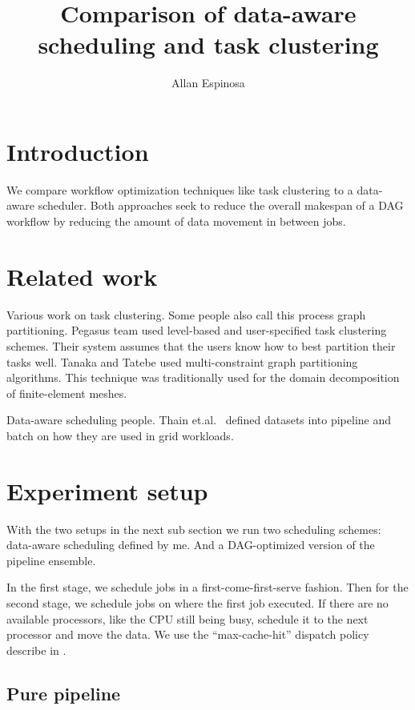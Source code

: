 \documentclass{article}
\title{Comparison of data-aware scheduling and task clustering}
\author{Allan Espinosa}
\begin{document}
\section{Introduction} %
\label{sec:introduction}
We compare workflow optimization techniques like task clustering to a data-aware
scheduler.  Both approaches seek to reduce the overall makespan of a DAG
workflow by reducing the amount of data movement in between jobs.


\section{Related work} %
\label{sec:related_work}

Various work on task clustering.  Some people also call this process graph
partitioning.  Pegasus \cite{Singh2008} team used level-based and user-specified
task clustering schemes.  Their system assumes that the users know how to best
partition their tasks well.  Tanaka and Tatebe \cite{Tanaka2012} used
multi-constraint graph partitioning algorithms.  This technique was
traditionally used for the domain decomposition of finite-element meshes.

Data-aware scheduling people.  Thain et.al.\ \cite{Thain2003} defined datasets
into pipeline and batch on how they are used in grid workloads.  


\section{Experiment setup} %
\label{sec:experiment_setup}

With the two setups in the next sub section we run two scheduling schemes:
data-aware scheduling defined by me.  And a DAG-optimized version of the
pipeline ensemble.

In the first stage, we schedule jobs in a first-come-first-serve fashion.  Then
for the second stage, we schedule jobs on where the first job executed.  If
there are no available processors, like the CPU still being busy, schedule it to
the next processor and move the data.  We use the  ``max-cache-hit'' dispatch
policy describe in \cite{Raicu2008a}.

\subsection{Pure pipeline} %
\label{sub:pure_pipeline}
\end{document}

